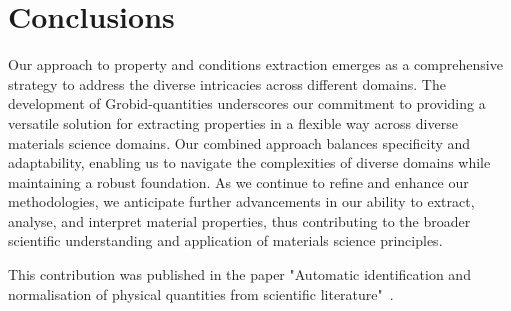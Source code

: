 \section{Conclusions}

Our approach to property and conditions extraction emerges as a comprehensive strategy to address the diverse intricacies across different domains. 
The development of Grobid-quantities underscores our commitment to providing a versatile solution for extracting properties in a flexible way across diverse materials science domains.
Our combined approach balances specificity and adaptability, enabling us to navigate the complexities of diverse domains while maintaining a robust foundation.
As we continue to refine and enhance our methodologies, we anticipate further advancements in our ability to extract, analyse, and interpret material properties, thus contributing to the broader scientific understanding and application of materials science principles.

This contribution was published in the paper "Automatic identification and normalisation of physical quantities from scientific literature"~\cite{foppiano2019quantities}.